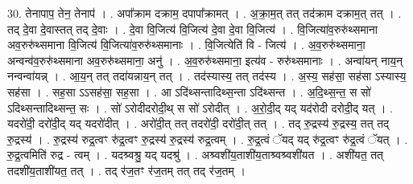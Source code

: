 \documentclass[17pt]{extarticle}
\begin{document}
30. तेनापाप॒ तेन॒ तेनाप॑ । . अपा᳚क्राम दक्राम॒ दपापा᳚क्रामत् । . अ॒क्रा॒म॒त् तत् तद॑क्राम दक्राम॒त् तत् । . तद् दे॒वा दे॒वास्तत् तद् दे॒वाः । . दे॒वा वि॒जित्य॑ वि॒जित्य॑ दे॒वा दे॒वा वि॒जित्य॑ । . वि॒जित्या॑व॒रुरु॑थ्समाना अव॒रुरु॑थ्समाना वि॒जित्य॑ वि॒जित्या॑व॒रुरु॑थ्समानाः । . वि॒जित्येति॑ वि - जित्य॑ । . अ॒व॒रुरु॑थ्समाना॒ अन्वन्व॑व॒रुरु॑थ्समाना अव॒रुरु॑थ्समाना॒ अनु॑ । . अ॒व॒रुरु॑थ्समाना॒ इत्य॑व - रुरु॑थ्समानाः । . अन्वा॑यन् नाय॒न् नन्वन्वा॑यन्न् । . आ॒य॒न् तत् तदा॑यन्नाय॒न् तत् । . तद॑स्यास्य॒ तत् तद॑स्य । . अ॒स्य॒ सह॑सा॒ सह॑सा ऽस्यास्य॒ सह॑सा । . सह॒सा ऽऽसह॑सा॒ सह॒सा । . आ ऽदि॑थ्सन्तादिथ्स॒न्ता ऽदि॑थ्सन्त । . अ॒दि॒थ्स॒न्त॒ स सो॑ ऽदिथ्सन्तादिथ्सन्त॒ सः । . सो॑ ऽरोदीदरोदी॒थ् स सो॑ ऽरोदीत् । . अ॒रो॒दी॒द् यद् यद॑रोदी दरोदी॒द् यत् । . यदरो॑दी॒ दरो॑दी॒द् यद् यदरो॑दीत् । . अरो॑दी॒त् तत् तदरो॑दी॒ दरो॑दी॒त् तत् । . तद् रु॒द्रस्य॑ रु॒द्रस्य॒ तत् तद् रु॒द्रस्य॑ । . रु॒द्रस्य॑ रुद्र॒त्वꣳ रु॑द्र॒त्वꣳ रु॒द्रस्य॑ रु॒द्रस्य॑ रुद्र॒त्वम् । . रु॒द्र॒त्वं ॅयद् यद् रु॑द्र॒त्वꣳ रु॑द्र॒त्वं ॅयत् । . रु॒द्र॒त्वमिति॑ रुद्र - त्वम् । . यदश्र्वश्रु॒ यद् यदश्रु॑ । . अश्र्वशी॑य॒ताशी॑य॒ताश्र्वश्र्वशी॑यत । . अशी॑यत॒ तत् तदशी॑य॒ताशी॑यत॒ तत् । . तद् र॑ज॒तꣳ र॑ज॒तम् तत् तद् र॑ज॒तम् । \newline
\end{document}
